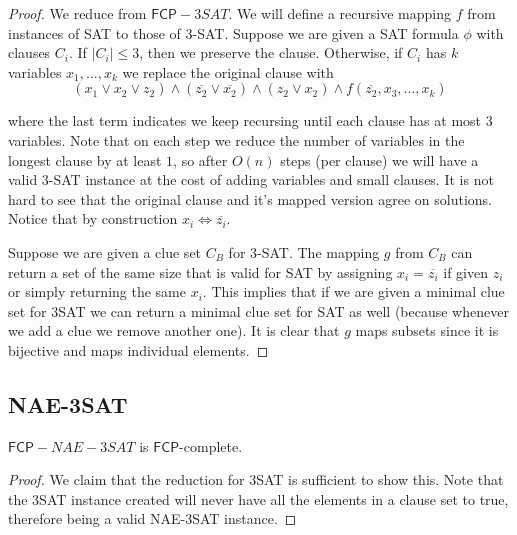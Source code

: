 \documentclass[runningheads,a4paper]{llncs}
\begin{document}
\begin{proof}
We reduce from $\mathsf{FCP}-3SAT$. We will define a recursive mapping $f$ from instances of SAT to those of 3-SAT. Suppose we are given a SAT formula $\phi$ with clauses $C_i$. If $|C_i| \leq 3$, then we preserve the clause. Otherwise, if $C_i$ has $k$ variables $x_1,...,x_k$ we replace the original clause with 
\[ 
(x_1 \vee x_2 \vee z_2) \wedge (\overline{z_2} \vee \overline{x_2}) \wedge (z_2 \vee x_2) \wedge f(\overline{z_2}, x_3, ..., x_k) 
\]

where the last term indicates we keep recursing until each clause has at most $3$ variables. Note that on each step we reduce the number of variables in the longest clause by at least $1$, so after $O(n)$ steps (per clause) we will have a valid 3-SAT instance at the cost of adding variables and small clauses. It is not hard to see that the original clause and it's mapped version agree on solutions. Notice that by construction $x_i \iff \overline{z_i}$. 

Suppose we are given a clue set $C_B$ for 3-SAT. The mapping $g$ from $C_B$ can return a set of the same size that is valid for SAT by assigning $x_i = \overline{z_i}$ if given $z_i$ or simply returning the same $x_i$. This implies that if we are given a minimal clue set for 3SAT we can return a minimal clue set for SAT as well (because whenever we add a clue we remove another one). It is clear that $g$ maps subsets since it is bijective and maps individual elements. 

\end{proof}

\subsection{NAE-3SAT}

\begin{theorem}
$\mathsf{FCP}-NAE-3SAT$ is $\mathsf{FCP}$-complete. 
\end{theorem} 

\begin{proof}
We claim that the reduction for 3SAT is sufficient to show this. Note that the 3SAT instance created will never have all the elements in a clause set to true, therefore being a valid NAE-3SAT instance. 
\end{proof}

%
%
%
%
%
\end{document}
